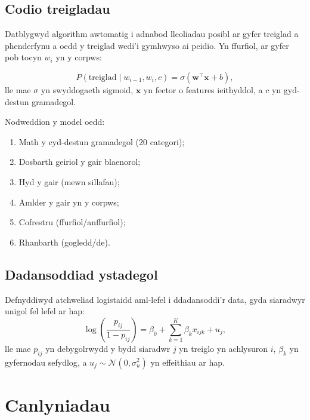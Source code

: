 \documentclass[12pt,a4paper]{article}
\begin{document}
\subsection{Codio treigladau}

Datblygwyd algorithm awtomatig i adnabod lleoliadau posibl
ar gyfer treiglad a phenderfynu a oedd y treiglad wedi'i
gymhwyso ai peidio. Yn ffurfiol, ar gyfer pob tocyn $w_i$
yn y corpws:

\begin{equation}
\label{eq:treiglad_model}
P(\text{treiglad} \mid w_{i-1}, w_i, c) = \sigma(\mathbf{w}^\top \mathbf{x} + b),
\end{equation}
lle mae $\sigma$ yn swyddogaeth sigmoid, $\mathbf{x}$ yn
fector o features ieithyddol, a $c$ yn gyd-destun gramadegol.

Nodweddion y model oedd:
\begin{enumerate}[label=(\alph*)]
  \item Math y cyd-destun gramadegol (20 categori);
  \item Dosbarth geiriol y gair blaenorol;
  \item Hyd y gair (mewn sillafau);
  \item Amlder y gair yn y corpws;
  \item Cofrestru (ffurfiol/anffurfiol);
  \item Rhanbarth (gogledd/de).
\end{enumerate}

\subsection{Dadansoddiad ystadegol}

Defnyddiwyd atchweliad logistaidd aml-lefel i ddadansoddi'r
data, gyda siaradwyr unigol fel lefel ar hap:
\begin{equation}
\label{eq:logistic}
\log\!\left(\frac{p_{ij}}{1 - p_{ij}}\right) = \beta_0 + \sum_{k=1}^{K} \beta_k x_{ijk} + u_j,
\end{equation}
lle mae $p_{ij}$ yn debygolrwydd y bydd siaradwr $j$ yn
treiglo yn achlysuron $i$, $\beta_k$ yn gyfernodau sefydlog,
a $u_j \sim \mathcal{N}(0, \sigma_u^2)$ yn effeithiau ar hap.

\section{Canlyniadau}
\label{sec:canlyniadau}
\end{document}

